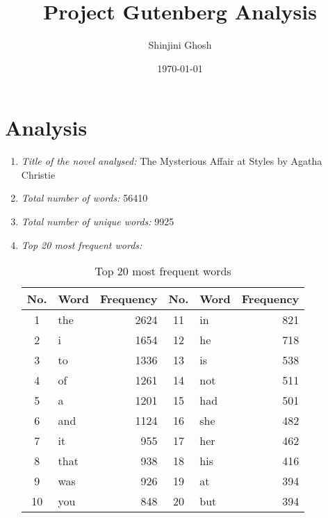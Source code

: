 \documentclass[12pt]{article}
\title{Project Gutenberg Analysis}
\author{Shinjini Ghosh}
\date{\today}
\begin{document}
\maketitle

\section*{Analysis}

\begin{enumerate}
  \item \textit{Title of the novel analysed:} The Mysterious Affair at Styles by Agatha Christie
  \item \textit{Total number of words:} 56410
  \item \textit{Total number of unique words:} 9925
  \item \textit{Top 20 most frequent words:}
        \begin{table}[h]
          \centering
          \begin{tabular}{c|l|r||c|l|r}
            \toprule
            No. & Word & Frequency & No. & Word & Frequency \\
            \midrule
            1 & the & 2624 & 11 & in & 821 \\
            2 & i & 1654 & 12 & he & 718 \\
            3 & to & 1336 & 13 & is & 538 \\
            4 & of & 1261 & 14 & not & 511 \\
            5 & a & 1201 & 15 & had & 501 \\
            6 & and & 1124 & 16 & she & 482 \\
            7 & it & 955 & 17 & her & 462 \\
            8 & that & 938 & 18 & his & 416 \\
            9 & was & 926 & 19 & at & 394 \\
            10 & you & 848 & 20 & but & 394 \\
            \bottomrule
          \end{tabular}
          \caption{Top 20 most frequent words}
          \label{top20}
        \end{table}
\end{enumerate}
\end{document}
